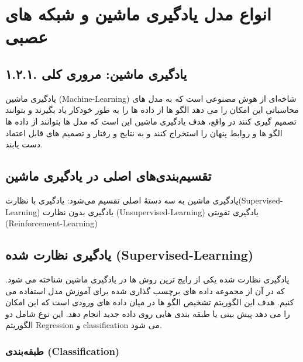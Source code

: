 \section{انواع مدل یادگیری ماشین و شبکه های عصبی}

\subsection{۱.۲.۱. یادگیری ماشین: مروری کلی}

یادگیری ماشین (Machine-Learning) شاخه‌ای از هوش مصنوعی است که به مدل های محاسباتی این امکان را می دهد الگو ها  از داده ها را به طور خودکار یاد بگیرند و بتوانند تصمیم گیری کنند در واقع، هدف یادگیری ماشین این است که مدل ها بتوانند  از داده ها الگو ها و روابط پنهان را استخراج کنند و به نتایج و رفتار و تصمیم های قابل اعتماد دست یابند.
\subsection{تقسیم‌بندی‌های اصلی در یادگیری ماشین}

یادگیری ماشین به سه دستهٔ اصلی تقسیم می‌شود:
یادگیری با نظارت(Supervised-Learning)
یادگیری بدون نظارت (Unsupervised-Learning)
یادگیری تقویتی (Reinforcement-Learning)

\subsection{یادگیری نظارت شده (Supervised-Learning)}
یادگیری نظارت شده یکی از رایج ترین روش ها در یادگیری ماشین شناخته می شود. که در آن از مجموعه داده های برچسب گذاری شده برای آموزش مدل استفاده می کنیم.
هدف این الگوریتم تشخیص الگو ها در میان داده های ورودی است که این امکان را می دهد  پیش بینی یا طبقه بندی هایی روی داده جدید انجام دهد.
این نوع شامل دو الگوریتم Regression  و classification  می شود.

\subsubsection{طبقه‌بندی (Classification)}




